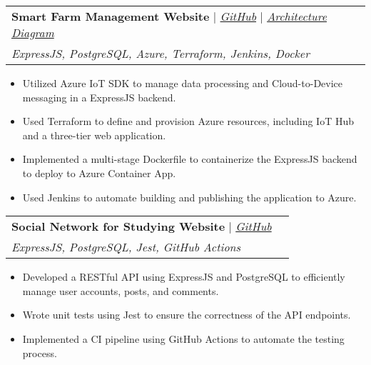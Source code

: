 \documentclass[letterpaper,11pt]{article}
\makeatletter
\newcommand{\resumeItem}[1]{
  \item\small{
    {#1 \vspace{-2pt}}
  }
}
\newcommand{\resumeProjectHeading}[4]{
    \vspace{-2pt}\item
    \begin{tabular*}{0.97\textwidth}{l@{\extracolsep{\fill}}r}
      #1 & \small#2 \\
      \textit{\small#3} & \small #4 \\
    \end{tabular*}\vspace{-7pt}
}
\newcommand{\resumeItemListStart}{\begin{itemize}}
\newcommand{\resumeItemListEnd}{\end{itemize}\vspace{-5pt}}
\makeatother
\begin{document}
      \resumeProjectHeading
        {\textbf{Smart Farm Management Website} $|$ \emph{\href{https://github.com/kng1259/IOT-project}{GitHub}} $|$ \emph{\href{https://drive.google.com/file/d/1EoGsjEHycOAPmUl10ieyaEXncYd-JI56/view?usp=sharing}{Architecture Diagram}}}{}
        {ExpressJS, PostgreSQL, Azure, Terraform, Jenkins, Docker}{}
          \resumeItemListStart
            \resumeItem{Utilized {Azure IoT SDK} to manage data processing and Cloud-to-Device messaging in a {ExpressJS} backend.}
            \resumeItem{Used {Terraform} to define and provision Azure resources, including IoT Hub and a three-tier web application.}
            \resumeItem{Implemented a multi-stage {Dockerfile} to containerize the ExpressJS backend to deploy to Azure Container App.}
            \resumeItem{Used {Jenkins} to automate building and publishing the application to Azure.}
          \resumeItemListEnd
      

      \resumeProjectHeading
        {\textbf{Social Network for Studying Website} $|$ \emph{\href{https://github.com/NguyenVu04/Do_An}{GitHub}}}{}
        {ExpressJS, PostgreSQL, Jest, GitHub Actions}{}
          \resumeItemListStart
            \resumeItem{Developed a {RESTful API} using {ExpressJS} and PostgreSQL to efficiently manage user accounts, posts, and comments.}
            \resumeItem{Wrote unit tests using {Jest} to ensure the correctness of the API endpoints.}
            \resumeItem{Implemented a CI pipeline using {GitHub Actions} to automate the testing process.}
          \resumeItemListEnd

\end{document}
